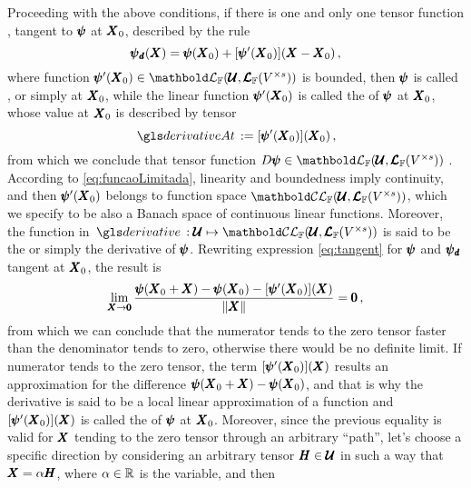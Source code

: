 Proceeding with the above conditions, if there is one and only one tensor function , tangent to $\pmb{\psi}$ at $\pmb{X}_0$, described by the rule
\begin{equation}\label{eq:tangentFunct}
\pmb{\psi_\mathit{d}}(\pmb{X})=\pmb{\psi}(\pmb{X}_0)+[\pmb{\psi}'(\pmb{X}_0)](\pmb{X}-\pmb{X}_0)\,,
\end{equation}
where function $\fua{\tnr{\psi}'}{\tnr{X}_0}\in\evl{\cam{F}}{\pmb{\mathcal{U}}}{\ete{\cam{F}}{V^{\times s}}}$ is bounded, then $\pmb{\psi}$ is called ,  or simply  at $\pmb{X}_0$, while the linear function $\pmb{\psi}'(\pmb{X}_0)$ is called the  of $\pmb{\psi}$ at $\pmb{X}_0$, whose value at $\pmb{X}_0$ is described by tensor 
\begin{equation}
\gloref{derivativeAt}:=[\fua{\tnr{\psi}'}{\tnr{X}_0}](\tnr{X}_0)\,, 
\end{equation}
from which we conclude that tensor function $D\tnr{\psi}\in\evl{\cam{F}}{\pmb{\mathcal{U}}}{\ete{\cam{F}}{V^{\times s}}}$ . According to \eqref{eq:funcaoLimitada}, linearity and boundedness imply continuity, and then $\pmb{\psi}'(\pmb{X}_0)$ belongs to function space $\evlc{\cam{F}}{\pmb{\mathcal{U}}}{\ete{\cam{F}}{V^{\times s}}}$, which we specify to be also a Banach space of continuous linear functions. Moreover, the function in
$\map{\gloref{derivative}}{\pmb{\mathcal{U}}}{\evlc{\cam{F}}{\pmb{\mathcal{U}}}{\ete{\cam{F}}{V^{\times s}}}}$ is said to be the  or simply the derivative of $\pmb{\psi}$. 
Rewriting expression \eqref{eq:tangent} for $\pmb{\psi}$ and $\pmb{\psi_\mathit{d}}$ tangent at $\pmb{X}_0$, the result is
\begin{equation}\label{eq:preDirect}
\lim_{\pmb{X}\to \pmb{0}} \dfrac{\pmb{\psi}(\pmb{X}_0+\pmb{X})-\pmb{\psi}(\pmb{X}_0)-[\pmb{\psi}'(\pmb{X}_0)](\pmb{X})}{\|\pmb{X}\|}=\pmb{0}\,,
\end{equation}
from which we can conclude that the numerator tends to the zero tensor faster than the denominator tends to zero, otherwise there would be no definite limit. If numerator tends to the zero tensor, the term $[\pmb{\psi}'(\pmb{X}_0)](\pmb{X})$ results an approximation for the difference $\pmb{\psi}(\pmb{X}_0+\pmb{X})-\pmb{\psi}(\pmb{X}_0)$, and that is why the derivative is said to be a local linear approximation of a function and $[\pmb{\psi}'(\pmb{X}_0)](\pmb{X})$ is called the  of $\pmb{\psi}$ at $\pmb{X}_0$. Moreover, since the previous equality is valid for $\pmb{X}$ tending to the zero tensor through an arbitrary ``path'', let's choose a specific direction by considering an arbitrary tensor $\pmb{H}\in\pmb{\mathcal{U}}$ in such a way that $\pmb{X}=\alpha\pmb{H}$, where $\alpha\in\mathbb{R}$ is the variable, and then
